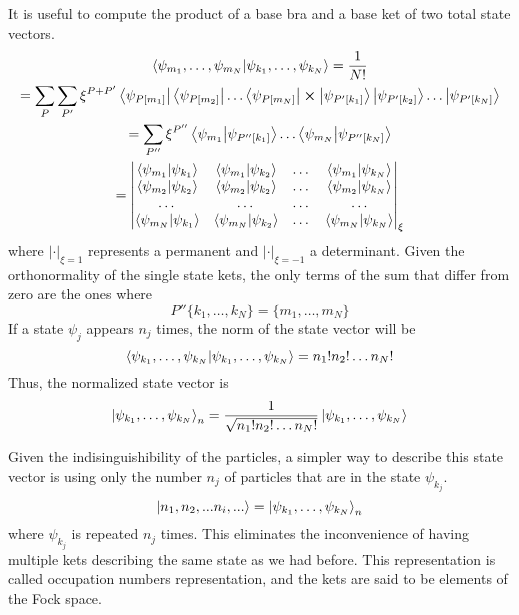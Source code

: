 It is useful to compute the product of a base bra and a base ket of two total state vectors.
\begin{multline} \label{eq:base_product}
    \bra{\psi_{m_1}, \dots, \psi_{m_N}} \ket{\psi_{k_1}, \dots, \psi_{k_N}} = \frac{1}{N!}
    \\ = \sum_P \sum_{P'} \xi^{P+P'} \bra{\psi_{P[m_1]}}\bra{\psi_{P[m_2]}}\dots\bra{\psi_{P[m_N]}} \cross \ket{\psi_{P'[k_1]}}\ket{\psi_{P'[k_2]}}\dots\ket{\psi_{P'[k_N]}}
    \\ = \sum_{P''} \xi^{P''} \braket{\psi_{m_1}}{\psi_{P''[k_1]}} \dots \braket{\psi_{m_N}}{\psi_{P''[k_N]}}
    \\ = \begin{vmatrix}
        \braket{\psi_{m_1}}{\psi_{k_1}} & \braket{\psi_{m_1}}{\psi_{k_2}} & \dots & \braket{\psi_{m_1}}{\psi_{k_N}} \\
        \braket{\psi_{m_2}}{\psi_{k_2}} & \braket{\psi_{m_2}}{\psi_{k_2}} & \dots & \braket{\psi_{m_2}}{\psi_{k_N}} \\
        \dots                           & \dots                           & \dots & \dots                           \\
        \braket{\psi_{m_N}}{\psi_{k_1}} & \braket{\psi_{m_N}}{\psi_{k_2}} & \dots & \braket{\psi_{m_N}}{\psi_{k_N}}
    \end{vmatrix}_\xi
\end{multline}
where $|\cdot|_{\xi = 1}$ represents a permanent and $|\cdot|_{\xi = -1}$ a determinant. Given the orthonormality of the single state kets, the only terms of the sum that differ from zero are the ones where
\begin{equation}
    P''\{k_1, \dots, k_N\} = \{m_1, \dots, m_N\}
\end{equation}
If a state $\psi_j$ appears $n_j$ times, the norm of the state vector will be
\begin{equation}
    \braket{\psi_{k_1}, \dots, \psi_{k_N}} = n_1!n_2!\dots n_N!
\end{equation}
Thus, the normalized state vector is
\begin{equation}
    \ket{\psi_{k_1}, \dots, \psi_{k_N}}_n= \frac{1}{\sqrt{n_1!n_2!\dots n_N!}} \ket{\psi_{k_1}, \dots, \psi_{k_N}}
\end{equation}

Given the indisinguishibility of the particles, a simpler way to describe this state vector is using only the number $n_j$ of particles that are in the state $\psi_{k_j}$.
\begin{equation} \label{eq:occupation_definition}
    \ket{n_1, n_2, ... n_i, ...} = \ket{\psi_{k_1}, \dots, \psi_{k_N}}_n
\end{equation}
where $\psi_{k_j}$ is repeated $n_j$ times. This eliminates the inconvenience of having multiple kets describing the same state as we had before. This representation is called occupation numbers representation, and the kets are said to be elements of the Fock space.

